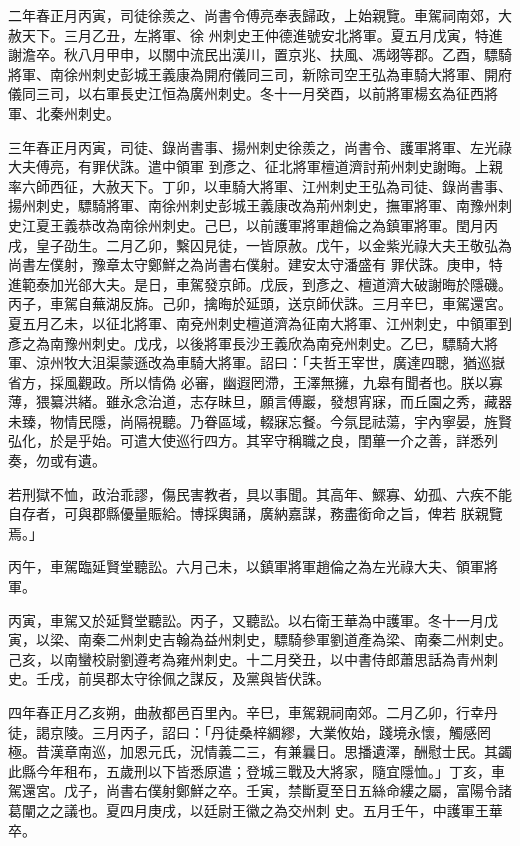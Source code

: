 \begin{pinyinscope}
 二年春正月丙寅，司徒徐羨之、尚書令傅亮奉表歸政，上始親覽。車駕祠南郊，大赦天下。三月乙丑，左將軍、徐
 州刺史王仲德進號安北將軍。夏五月戊寅，特進謝澹卒。秋八月甲申，以關中流民出漢川，置京兆、扶風、馮翊等郡。乙酉，驃騎將軍、南徐州刺史彭城王義康為開府儀同三司，新除司空王弘為車騎大將軍、開府儀同三司，以右軍長史江恒為廣州刺史。冬十一月癸酉，以前將軍楊玄為征西將軍、北秦州刺史。



 三年春正月丙寅，司徒、錄尚書事、揚州刺史徐羨之，尚書令、護軍將軍、左光祿大夫傅亮，有罪伏誅。遣中領軍
 到彥之、征北將軍檀道濟討荊州刺史謝晦。上親率六師西征，大赦天下。丁卯，以車騎大將軍、江州刺史王弘為司徒、錄尚書事、揚州刺史，驃騎將軍、南徐州刺史彭城王義康改為荊州刺史，撫軍將軍、南豫州刺史江夏王義恭改為南徐州刺史。己巳，以前護軍將軍趙倫之為鎮軍將軍。閏月丙戌，皇子劭生。二月乙卯，繫囚見徒，一皆原赦。戊午，以金紫光祿大夫王敬弘為尚書左僕射，豫章太守鄭鮮之為尚書右僕射。建安太守潘盛有
 罪伏誅。庚申，特進範泰加光郤大夫。是日，車駕發京師。戊辰，到彥之、檀道濟大破謝晦於隱磯。丙子，車駕自蕪湖反旆。己卯，擒晦於延頭，送京師伏誅。三月辛巳，車駕還宮。夏五月乙未，以征北將軍、南兗州刺史檀道濟為征南大將軍、江州刺史，中領軍到彥之為南豫州刺史。戊戌，以後將軍長沙王義欣為南兗州刺史。乙巳，驃騎大將軍、涼州牧大沮渠蒙遜改為車騎大將軍。詔曰：「夫哲王宰世，廣達四聰，猶巡嶽省方，採風觀政。所以情偽
 必審，幽遐罔滯，王澤無擁，九皋有聞者也。朕以寡薄，猥纂洪緒。雖永念治道，志存昧旦，願言傅巖，發想宵寐，而丘園之秀，藏器未臻，物情民隱，尚隔視聽。乃眷區域，輟寐忘餐。今氛昆祛蕩，宇內寧晏，旌賢弘化，於是乎始。可遣大使巡行四方。其宰守稱職之良，閨蓽一介之善，詳悉列奏，勿或有遺。



 若刑獄不恤，政治乖謬，傷民害教者，具以事聞。其高年、鰥寡、幼孤、六疾不能自存者，可與郡縣優量賑給。博採輿誦，廣納嘉謀，務盡銜命之旨，俾若
 朕親覽焉。」



 丙午，車駕臨延賢堂聽訟。六月己未，以鎮軍將軍趙倫之為左光祿大夫、領軍將軍。



 丙寅，車駕又於延賢堂聽訟。丙子，又聽訟。以右衛王華為中護軍。冬十一月戊寅，以梁、南秦二州刺史吉翰為益州刺史，驃騎參軍劉道產為梁、南秦二州刺史。己亥，以南蠻校尉劉遵考為雍州刺史。十二月癸丑，以中書侍郎蕭思話為青州刺史。壬戌，前吳郡太守徐佩之謀反，及黨與皆伏誅。



 四年春正月乙亥朔，曲赦都邑百里內。辛巳，車駕親祠南郊。二月乙卯，行幸丹徒，謁京陵。三月丙子，詔曰：「丹徒桑梓綢繆，大業攸始，踐境永懷，觸感罔極。昔漢章南巡，加恩元氏，況情義二三，有兼曩日。思播遺澤，酬慰士民。其蠲此縣今年租布，五歲刑以下皆悉原遣；登城三戰及大將家，隨宜隱恤。」丁亥，車駕還宮。戊子，尚書右僕射鄭鮮之卒。壬寅，禁斷夏至日五絲命縷之屬，富陽令諸葛闡之之議也。夏四月庚戌，以廷尉王徽之為交州刺
 史。五月壬午，中護軍王華卒。




\end{pinyinscope}
